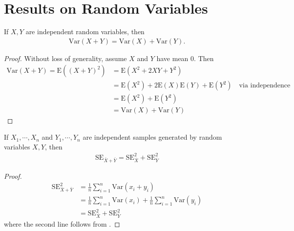 \chapter{Results on Random Variables}
\begin{lemma}
	\label{lem:var_addition}
	If $X,Y$ are independent random variables, then
	\begin{equation*}
		\begin{split}
			\mathrm{Var}(X+Y) = \mathrm{Var}(X) + \mathrm{Var}(Y).
		\end{split}
	\end{equation*}
	\begin{proof}
		Without loss of generality, assume $X$ and $Y$ have mean $0$. Then
		\begin{equation*}
			\begin{split}
				\mathrm{Var}(X+Y) =  \mathrm{E}( (X + Y)^{2} ) & = \mathrm{E}(X^{2} + 2XY + Y^{2})
				\\
				& = \mathrm{E}(X^{2}) + 2 \mathrm{E}(X) \mathrm{E}(Y) + \mathrm{E}(Y^{2}) \quad \text{via independence}
				\\
				& = \mathrm{E}(X^{2}) + \mathrm{E}(Y^{2})
				\\
				& = \mathrm{Var}(X) + \mathrm{Var}(Y)
			\end{split}
		\end{equation*}

	\end{proof}

\end{lemma}
\begin{lemma}
	If $X_{1}, \cdots, X_{n}$ and $Y_{1}, \cdots, Y_{n}$ are independent samples
	generated by random variables $X, Y$,
	then
	\begin{equation*}
		\begin{split}
			\mathrm{SE}_{\bar{X} + \bar{Y}} = \mathrm{SE}_{\bar{X}}^{2} + \mathrm{SE}_{\bar{Y}}^{2}	
		\end{split}
	\end{equation*}

\end{lemma}
\begin{proof}
	\begin{equation*}
		\begin{split}
			\mathrm{SE}_{\bar{X} + \bar{Y}}^{2}
			& = \frac{1}{n}\sum_{i=1}^{n} \mathrm{Var}(x_{i} +
			y_{i}) \\
			& = \frac{1}{n}\sum_{i=1}^{n}\mathrm{Var}(x_{i}) +
			\frac{1}{n}\sum_{i=1}^{n}\mathrm{Var}(y_{i}) 
			\\
			& = \mathrm{SE}_{\bar{X}}^{2} + \mathrm{SE}_{\bar{Y}}^{2}
		\end{split}
	\end{equation*}
	where the second line follows from .
\end{proof}

